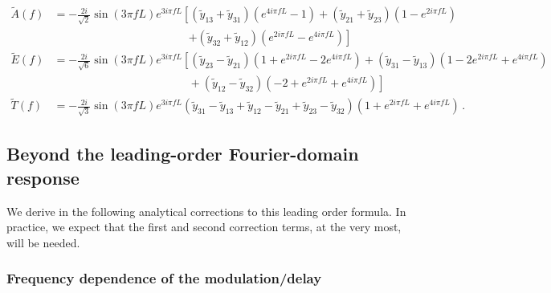 \documentclass[aps,showpacs,twocolumn,prd,superscriptaddress,nofootinbib]{revtex4}
\newcommand{\nn}{\nonumber}
\begin{document}
\begin{widetext}
\begin{align}
	\tilde{A}(f) &= - \frac{2i}{\sqrt{2}} \sin\left(3\pi f L\right) e^{3 i \pi f L} \left[ \left( \tilde{y}_{13} + \tilde{y}_{31} \right) \left( e^{4i\pi f L} - 1 \right) + \left( \tilde{y}_{21} + \tilde{y}_{23} \right) \left( 1 - e^{2i\pi f L} \right) \right. \nn\\
	& \qquad\qquad\qquad\qquad\qquad\qquad \left. + \left( \tilde{y}_{32} + \tilde{y}_{12} \right) \left( e^{2i\pi f L} - e^{4i\pi f L} \right) \right] \nn\\
	\tilde{E}(f) &= - \frac{2i}{\sqrt{6}} \sin\left(3\pi f L\right) e^{3 i \pi f L} \left[ \left( \tilde{y}_{23} - \tilde{y}_{21} \right) \left( 1 + e^{2i\pi f L} - 2e^{4i \pi f L} \right) + \left( \tilde{y}_{31} - \tilde{y}_{13} \right) \left( 1 - 2e^{2i\pi f L} + e^{4i \pi f L} \right) \right. \nn\\
	& \qquad\qquad\qquad\qquad\qquad\qquad + \left( \tilde{y}_{12} - \tilde{y}_{32} \right) \left( -2 + e^{2i\pi f L} + e^{4i \pi f L} \right) \left. \right] \nn\\
	\tilde{T}(f) &= - \frac{2i}{\sqrt{3}} \sin\left(3\pi f L\right) e^{3 i \pi f L} \left( \tilde{y}_{31} - \tilde{y}_{13} + \tilde{y}_{12} - \tilde{y}_{21} + \tilde{y}_{23} - \tilde{y}_{32} \right) \left( 1 + e^{2i\pi f L} + e^{4i \pi f L} \right) \,.
\end{align}
\end{widetext}
%


\subsection{Beyond the leading-order Fourier-domain response}
\label{appsubsec:nloresponse}

We derive in the following analytical corrections to this leading order formula. In practice, we expect that the first and second correction terms, at the very most, will be needed.

\subsubsection*{Frequency dependence of the modulation/delay}
\end{document}
